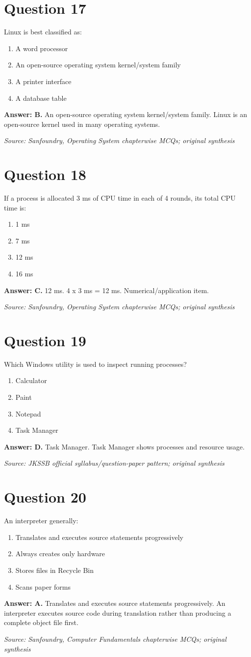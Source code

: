 \documentclass[11pt,a4paper]{book}
\newcommand{\source}[1]{\par\smallskip\textit{Source: #1}}
\newcommand{\answer}[2]{\par\textbf{Answer: #1.} #2}
\begin{document}
\section*{Question 17}
Linux is best classified as:
\begin{enumerate}[label=\Alph*.]
\item A word processor
\item An open-source operating system kernel/system family
\item A printer interface
\item A database table
\end{enumerate}
\answer{B}{An open-source operating system kernel/system family. Linux is an open-source kernel used in many operating systems.}
\source{Sanfoundry, Operating System chapterwise MCQs; original synthesis}
\section*{Question 18}
If a process is allocated 3 ms of CPU time in each of 4 rounds, its total CPU time is:
\begin{enumerate}[label=\Alph*.]
\item 1 ms
\item 7 ms
\item 12 ms
\item 16 ms
\end{enumerate}
\answer{C}{12 ms. 4 x 3 ms = 12 ms. Numerical/application item.}
\source{Sanfoundry, Operating System chapterwise MCQs; original synthesis}
\section*{Question 19}
Which Windows utility is used to inspect running processes?
\begin{enumerate}[label=\Alph*.]
\item Calculator
\item Paint
\item Notepad
\item Task Manager
\end{enumerate}
\answer{D}{Task Manager. Task Manager shows processes and resource usage.}
\source{JKSSB official syllabus/question-paper pattern; original synthesis}
\section*{Question 20}
An interpreter generally:
\begin{enumerate}[label=\Alph*.]
\item Translates and executes source statements progressively
\item Always creates only hardware
\item Stores files in Recycle Bin
\item Scans paper forms
\end{enumerate}
\answer{A}{Translates and executes source statements progressively. An interpreter executes source code during translation rather than producing a complete object file first.}
\source{Sanfoundry, Computer Fundamentals chapterwise MCQs; original synthesis}
\end{document}
